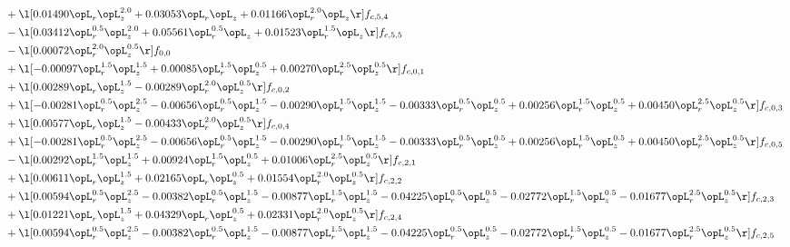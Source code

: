 \begin{alignat}{2}
& + \l[  0.01490 \opL_r \opL_z^{2.0} +  0.03053 \opL_r \opL_z +  0.01166 \opL_r^{2.0} \opL_z  \r] f_{c,5,4} \nonumber \\ 
& - \l[  0.03412 \opL_r^{0.5} \opL_z^{2.0} +  0.05561 \opL_r^{0.5} \opL_z +  0.01523 \opL_r^{1.5} \opL_z  \r] f_{c,5,5} \nonumber \\ 
& - \l[  0.00072 \opL_r^{2.0} \opL_z^{0.5}  \r] f_{0,0} \nonumber \\ 
& + \l[  -0.00097 \opL_r^{1.5} \opL_z^{1.5} +  0.00085 \opL_r^{1.5} \opL_z^{0.5} +  0.00270 \opL_r^{2.5} \opL_z^{0.5}  \r] f_{c,0,1} \nonumber \\ 
& + \l[  0.00289 \opL_r \opL_z^{1.5}   -0.00289 \opL_r^{2.0} \opL_z^{0.5}  \r] f_{c,0,2} \nonumber \\ 
& + \l[  -0.00281 \opL_r^{0.5} \opL_z^{2.5}   -0.00656 \opL_r^{0.5} \opL_z^{1.5}   -0.00290 \opL_r^{1.5} \opL_z^{1.5}   -0.00333 \opL_r^{0.5} \opL_z^{0.5} +  0.00256 \opL_r^{1.5} \opL_z^{0.5} +  0.00450 \opL_r^{2.5} \opL_z^{0.5}  \r] f_{c,0,3} \nonumber \\ 
& + \l[  0.00577 \opL_r \opL_z^{1.5}   -0.00433 \opL_r^{2.0} \opL_z^{0.5}  \r] f_{c,0,4} \nonumber \\ 
& + \l[  -0.00281 \opL_r^{0.5} \opL_z^{2.5}   -0.00656 \opL_r^{0.5} \opL_z^{1.5}   -0.00290 \opL_r^{1.5} \opL_z^{1.5}   -0.00333 \opL_r^{0.5} \opL_z^{0.5} +  0.00256 \opL_r^{1.5} \opL_z^{0.5} +  0.00450 \opL_r^{2.5} \opL_z^{0.5}  \r] f_{c,0,5} \nonumber \\ 
& - \l[  0.00292 \opL_r^{1.5} \opL_z^{1.5} +  0.00924 \opL_r^{1.5} \opL_z^{0.5} +  0.01006 \opL_r^{2.5} \opL_z^{0.5}  \r] f_{c,2,1} \nonumber \\ 
& + \l[  0.00611 \opL_r \opL_z^{1.5} +  0.02165 \opL_r \opL_z^{0.5} +  0.01554 \opL_r^{2.0} \opL_z^{0.5}  \r] f_{c,2,2} \nonumber \\ 
& + \l[  0.00594 \opL_r^{0.5} \opL_z^{2.5}   -0.00382 \opL_r^{0.5} \opL_z^{1.5}   -0.00877 \opL_r^{1.5} \opL_z^{1.5}   -0.04225 \opL_r^{0.5} \opL_z^{0.5}   -0.02772 \opL_r^{1.5} \opL_z^{0.5}   -0.01677 \opL_r^{2.5} \opL_z^{0.5}  \r] f_{c,2,3} \nonumber \\ 
& + \l[  0.01221 \opL_r \opL_z^{1.5} +  0.04329 \opL_r \opL_z^{0.5} +  0.02331 \opL_r^{2.0} \opL_z^{0.5}  \r] f_{c,2,4} \nonumber \\ 
& + \l[  0.00594 \opL_r^{0.5} \opL_z^{2.5}   -0.00382 \opL_r^{0.5} \opL_z^{1.5}   -0.00877 \opL_r^{1.5} \opL_z^{1.5}   -0.04225 \opL_r^{0.5} \opL_z^{0.5}   -0.02772 \opL_r^{1.5} \opL_z^{0.5}   -0.01677 \opL_r^{2.5} \opL_z^{0.5}  \r] f_{c,2,5} \nonumber \\ 

\end{alignat}
